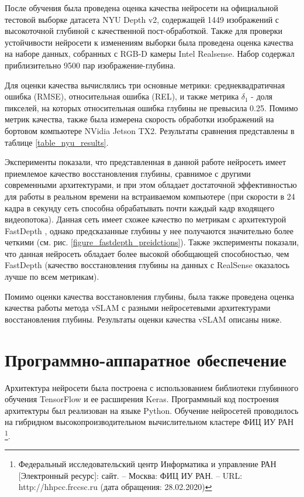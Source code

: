 \documentclass{mipt-thesis-ms}
\begin{document}
	После обучения была проведена оценка качества нейросети на официальной тестовой выборке датасета NYU Depth v2, содержащей 1449 изображений с высокоточной глубиной с качественной пост-обработкой. Также для проверки устойчивости нейросети к изменениям выборки была проведена оценка качества на наборе данных, собранных с RGB-D камеры Intel Realsense. Набор содержал приблизительно 9500 пар изображение-глубина.
	
	Для оценки качества вычислялись три основные метрики: среднеквадратичная ошибка (RMSE), относительная ошибка (REL), и также метрика $\delta_1$ - доля пикселей, на которых относительная ошибка глубины не превысила 0.25. Помимо метрик качества, также была измерена скорость обработки изображений на бортовом компьютере NVidia Jetson TX2. Результаты сравнения представлены в таблице \ref{table_nyu_results}.
	
	Эксперименты показали, что представленная в данной работе нейросеть имеет приемлемое качество восстановления глубины, сравнимое с другими современными архитектурами, и при этом обладает достаточной эффективностью для работы в реальном времени на встраиваемом компьютере (при скорости в 24 кадра в секунду сеть способна обрабатывать почти каждый кадр входящего видеопотока). Данная сеть имеет схожее качество по метрикам с архитектурой FastDepth \cite{wofk2019fastdepth}, однако предсказанные глубины у нее получаются значительно более четкими (см. рис. \ref{figure_fastdepth_preidctions}). Также эксперименты показали, что данная нейросеть обладает более высокой обобщающей способностью, чем FastDepth (качество восстановления глубины на данных с RealSense оказалось лучше по всем метрикам).
	
	Помимо оценки качества восстановления глубины, была также проведена оценка качества работы метода vSLAM с разными нейросетевыми архитектурами восстановления глубины. Результаты оценки качества vSLAM описаны ниже.
	
	\section{Программно-аппаратное обеспечение}
	
	Архитектура нейросети была построена с использованием библиотеки глубинного обучения TensorFlow и ее расширения Keras. Программный код построения архитектуры был реализован на языке Python. Обучение нейросетей проводилось на гибридном высокопроизводительном вычислительном кластере ФИЦ ИУ РАН \footnote{Федеральный исследовательский центр Информатика и управление РАН [Электронный ресурс]: сайт. – Москва: ФИЦ ИУ РАН. – URL: http://hhpcc.frccsc.ru (дата обращения: 28.02.2020)}.
	
\end{document}
